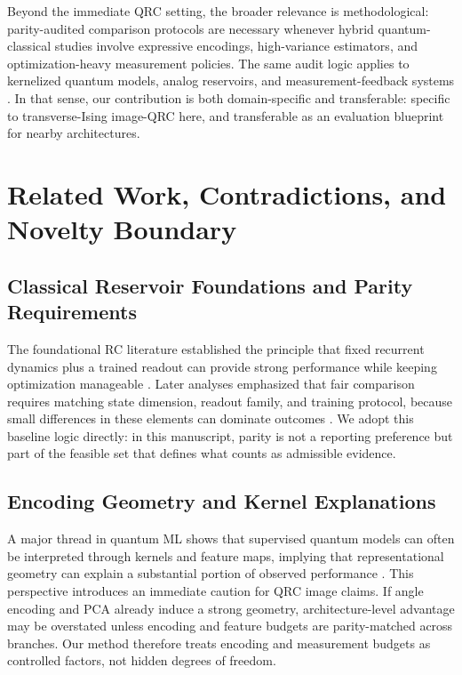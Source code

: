 \documentclass{article} %
\begin{document}
Beyond the immediate QRC setting, the broader relevance is methodological: parity-audited comparison protocols are necessary whenever hybrid quantum-classical studies involve expressive encodings, high-variance estimators, and optimization-heavy measurement policies. The same audit logic applies to kernelized quantum models, analog reservoirs, and measurement-feedback systems \citep{arxiv_2407_02553,arxiv_2310_06706,arxiv_2602_00610,arxiv_2602_19700,arxiv_2603_20167}. In that sense, our contribution is both domain-specific and transferable: specific to transverse-Ising image-QRC here, and transferable as an evaluation blueprint for nearby architectures.

\section{Related Work, Contradictions, and Novelty Boundary}
\label{sec:related}
\subsection{Classical Reservoir Foundations and Parity Requirements}
The foundational RC literature established the principle that fixed recurrent dynamics plus a trained readout can provide strong performance while keeping optimization manageable \citep{url_echo_state_2001,doi_10_1162_089976602760407955}. Later analyses emphasized that fair comparison requires matching state dimension, readout family, and training protocol, because small differences in these elements can dominate outcomes \citep{arxiv_2102_11831,arxiv_2201_07969}. We adopt this baseline logic directly: in this manuscript, parity is not a reporting preference but part of the feasible set that defines what counts as admissible evidence.

\subsection{Encoding Geometry and Kernel Explanations}
A major thread in quantum ML shows that supervised quantum models can often be interpreted through kernels and feature maps, implying that representational geometry can explain a substantial portion of observed performance \citep{arxiv_2101_11020,arxiv_2008_08605,arxiv_2502_06281,arxiv_2602_19644}. This perspective introduces an immediate caution for QRC image claims. If angle encoding and PCA already induce a strong geometry, architecture-level advantage may be overstated unless encoding and feature budgets are parity-matched across branches. Our method therefore treats encoding and measurement budgets as controlled factors, not hidden degrees of freedom.
\end{document}
